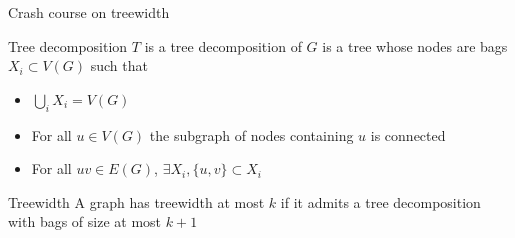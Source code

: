 \documentclass[11pt,dvipsnames,presentation,aspectratio=169]{beamer}
\newcommand{\myorange}{Orange}
\begin{document}
\begin{frame}{Crash course on treewidth}
  \begin{exampleblock}{Tree decomposition}
    $T$ is a tree decomposition of $G$ is a tree whose nodes are bags $X_i
    \subset V(G)$ such that
    \begin{itemize}
    \item $\bigcup_{i} X_i = V(G)$
    \item For all $u \in V(G)$ the subgraph of nodes containing $u$ is connected
    \item For all $uv \in E(G)$, $\exists X_i, \{u,v\} \subset X_i$
    \end{itemize}
  \end{exampleblock}

  \begin{exampleblock}{Treewidth}
    A graph has treewidth at most $k$ if it admits a tree decomposition with
    bags of size at most $k+1$
  \end{exampleblock}

  \begin{center}
  \end{center}
\end{frame}
\end{document}
